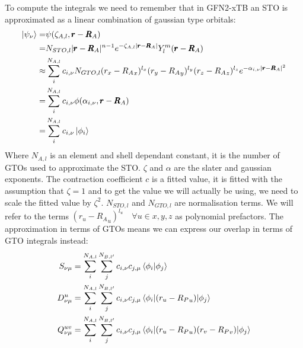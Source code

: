 To compute the integrals we need to remember that in GFN2-xTB an STO is approximated as a linear combination of gaussian type orbitals:
\begin{equation}
    \begin{split}
        \ket{\psi_\nu} =&\psi(\zeta_{A,l},\pmb r-\pmb R_A) \\
        = &N_{STO,l}|\pmb r-\pmb R_A|^{n-1}e^{-\zeta_{A,l}|\pmb r-\pmb R_A|}Y_l^m(\pmb r-\pmb R_A)\\
        \approx &\sum_i^{N_{A,l}}c_{i,\nu}N_{GTO,l}(r_x-{R_A}_x)^{l_x}(r_y-{R_A}_y)^{l_y}(r_z-{R_A}_z)^{l_z}e^{-\alpha_{i,\nu}|\pmb r-\pmb R_A|^2}\\
        =& \sum_i^{N_{A,l}}c_{i,\nu}\phi(\alpha_{i,\nu},\pmb r-\pmb R_A)\\
        =& \sum_i^{N_{A,l}}c_{i,\nu}\ket{\phi_i}
    \end{split}
\end{equation}
Where $N_{A,l}$ is an element and shell dependant constant, it is the number of GTOs used to approximate the STO. $\zeta$ and $\alpha$ are the slater and gaussian exponents. The contraction coefficient $c$ is a fitted value, it is fitted with the assumption that $\zeta=1$ and to get the value we will actually be using, we need to scale the fitted value by $\zeta^2$. $N_{STO,l}$ and $N_{GTO,l}$ are normalisation terms. 
We will refer to the terms $(r_u-{R_A}_u)^{l_u}\quad\forall{u\in x,y,z}$ as polynomial prefactors. 
The approximation in terms of GTOs means we can express our overlap in terms of GTO integrals instead:
\begin{align}
    S_{\nu\mu} &=\sum_i^{N_{A,l}}\sum_j^{N_{B,l'}}c_{i,\nu}c_{j,\mu} \braket{\phi_i|\phi_j}\\
    D_{\nu\mu}^u &=\sum_i^{N_{A,l}}\sum_j^{N_{B,l'}}c_{i,\nu}c_{j,\mu} \braket{\phi_i|(r_u-{R_P}_u)|\phi_j}\\
    Q_{\nu\mu}^{uv} &=\sum_i^{N_{A,l}}\sum_j^{N_{B,l'}}c_{i,\nu}c_{j,\mu} \braket{\phi_i|(r_u-{R_P}_u)(r_v-{R_P}_v)|\phi_j}
\end{align}
